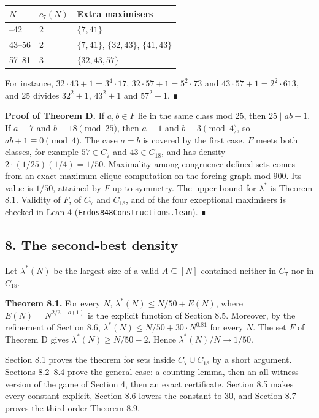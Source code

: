 \documentclass[
  11pt,
]{article}
\begin{document}
\begin{longtable}[]{@{}lll@{}}
\toprule\noalign{}
\(N\) & \(c_7(N)\) & Extra maximisers \\
\midrule\noalign{}
\endhead
\bottomrule\noalign{}
\endlastfoot
41--42 & 2 & \(\{7, 41\}\) \\
43--56 & 2 & \(\{7, 41\}\), \(\{32, 43\}\), \(\{41, 43\}\) \\
57--81 & 3 & \(\{32, 43, 57\}\) \\
\end{longtable}

For instance, \(32\cdot 43 + 1 = 3^4\cdot 17\),
\(32\cdot 57 + 1 = 5^2\cdot 73\) and \(43\cdot 57 + 1 = 2^2\cdot 613\),
and 25 divides \(32^2 + 1\), \(43^2 + 1\) and \(57^2 + 1\). ∎

\textbf{Proof of Theorem D.} If \(a, b \in F\) lie in the same class mod
25, then \(25 \mid ab + 1\). If \(a \equiv 7\) and
\(b \equiv 18 \pmod{25}\), then \(a \equiv 1\) and
\(b \equiv 3 \pmod{4}\), so \(ab + 1 \equiv 0 \pmod{4}\). The case
\(a = b\) is covered by the first case. \(F\) meets both classes, for
example \(57 \in C_7\) and \(43 \in C_{18}\), and has density
\(2\cdot(1/25)(1/4) = 1/50\). Maximality among congruence-defined sets
comes from an exact maximum-clique computation on the forcing graph mod
900. Its value is \(1/50\), attained by \(F\) up to symmetry. The upper
bound for \(\lambda^*\) is Theorem 8.1. Validity of \(F\), of \(C_7\)
and \(C_{18}\), and of the four exceptional maximisers is checked in
Lean 4 (\texttt{Erdos848Constructions.lean}). ∎

\subsection{8. The second-best density}

Let \(\lambda^*(N)\) be the largest size of a valid \(A \subseteq [N]\)
contained neither in \(C_7\) nor in \(C_{18}\).

\textbf{Theorem 8.1.} For every \(N\), \(\lambda^*(N) \le N/50 + E(N)\),
where \(E(N) = N^{2/3+o(1)}\) is the explicit function of Section 8.5.
Moreover, by the refinement of Section 8.6,
\(\lambda^*(N) \le N/50 + 30\cdot N^{0.81}\) for every \(N\). The set
\(F\) of Theorem D gives \(\lambda^*(N) \ge N/50 - 2\). Hence
\(\lambda^*(N)/N \to 1/50\).

Section 8.1 proves the theorem for sets inside \(C_7 \cup C_{18}\) by a
short argument. Sections 8.2--8.4 prove the general case: a counting
lemma, then an all-witness version of the game of Section 4, then an
exact certificate. Section 8.5 makes every constant explicit, Section
8.6 lowers the constant to 30, and Section 8.7 proves the third-order
Theorem 8.9.
\end{document}
